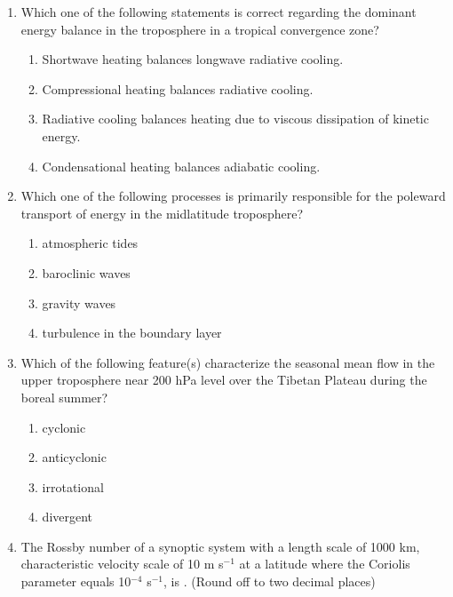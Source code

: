 \documentclass[a4paper,10pt]{article}
\begin{document}
\begin{enumerate}
\item Which one of the following statements is correct regarding the dominant energy balance in the troposphere in a tropical convergence zone?

\hfill{}
\begin{enumerate}
    \item Shortwave heating balances longwave radiative cooling.
    \item Compressional heating balances radiative cooling.
    \item Radiative cooling balances heating due to viscous dissipation of kinetic energy.
    \item Condensational heating balances adiabatic cooling.
\end{enumerate}

\item Which one of the following processes is primarily responsible for the poleward transport of energy in the midlatitude troposphere?

\hfill{}
\begin{enumerate}
    \item atmospheric tides
    \item baroclinic waves
    \item gravity waves
    \item turbulence in the boundary layer
\end{enumerate}

\item Which of the following feature(s) characterize the seasonal mean flow in the upper troposphere near 200 hPa level over the Tibetan Plateau during the boreal summer?

\hfill{}
\begin{enumerate}
    \item cyclonic
    \item anticyclonic
    \item irrotational
    \item divergent
\end{enumerate}

\item The Rossby number of a synoptic system with a length scale of 1000 km, characteristic velocity scale of 10 m s$^{-1}$ at a latitude where the Coriolis parameter equals 10$^{-4}$ s$^{-1}$, is \underline{\hspace{2cm}}. (Round off to two decimal places)


\end{enumerate}
\end{document}
